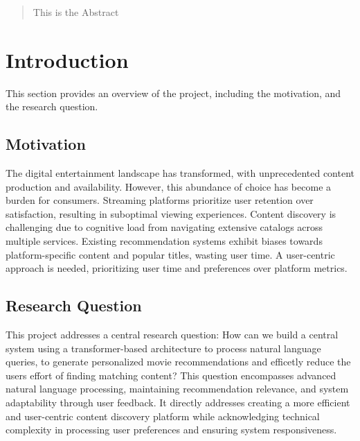 \documentclass[12pt,a4paper]{article}
\begin{document}


\begin{abstract}
\noindent \small 
This is the Abstract 
\end{abstract}

\small \tableofcontents

\begin{appendix}
  \small  %
  \small 
  \small \listoffigures
\end{appendix}

\newpage

\section{Introduction}
This section provides an overview of the project, including the motivation, and the research question.

\subsection{Motivation}

The digital entertainment landscape has transformed, with unprecedented content production and availability.
However, this abundance of choice has become a burden for consumers.
Streaming platforms prioritize user retention
over satisfaction, resulting in suboptimal viewing experiences.
Content discovery is challenging due to cognitive load from navigating extensive catalogs across multiple services.
Existing recommendation systems exhibit biases towards platform-specific content and popular titles, wasting user time.
A user-centric approach is needed, prioritizing user time and preferences over platform metrics.

\subsection{Research Question}

This project addresses a central research question:
How can we build a central system using a transformer-based architecture to process natural language queries,
to generate personalized movie recommendations and efficetly reduce the users effort of finding matching content?
\newline \noindent This question encompasses advanced natural language processing, maintaining recommendation relevance, and system
adaptability through user feedback. It directly addresses creating a more efficient and user-centric content discovery
platform while acknowledging technical complexity in processing user preferences and ensuring system responsiveness.
\end{document}
